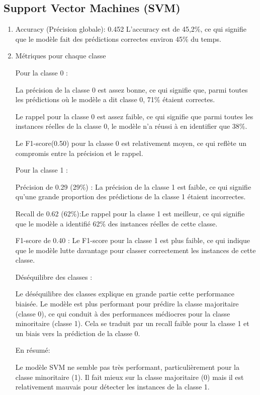 \subsection{Support Vector Machines (SVM)}
\begin{enumerate}
\item Accuracy (Précision globale): 0.452
L'accuracy est de 45,2\%, ce qui signifie que le modèle fait des prédictions correctes environ 45\% du temps.

\item Métriques pour chaque classe

Pour la classe 0 :

La précision de la classe 0 est assez bonne, ce qui signifie que, parmi toutes les prédictions où le modèle a dit classe 0, 71\% étaient correctes.

Le rappel pour la classe 0 est assez faible, ce qui signifie que parmi toutes les instances réelles de la classe 0, le modèle n'a réussi à en identifier que 38\%.

Le F1-score(0.50) pour la classe 0 est relativement moyen, ce qui reflète un compromis entre la précision et le rappel.

Pour la classe 1 :

Précision de  0.29 (29\%) : La précision de la classe 1 est faible, ce qui signifie qu'une grande proportion des prédictions de la classe 1 étaient incorrectes.


Recall de  0.62 (62\%):Le rappel pour la classe 1 est meilleur, ce qui signifie que le modèle a identifié 62\% des instances réelles de cette classe.

F1-score de 0.40 : Le F1-score pour la classe 1 est plus faible, ce qui indique que le modèle lutte davantage pour classer correctement les instances de cette classe.

Déséquilibre des classes :

Le déséquilibre des classes explique en grande partie cette performance biaisée. Le modèle est plus performant pour prédire la classe majoritaire (classe 0), ce qui conduit à des performances médiocres pour la classe minoritaire (classe 1). Cela se traduit par un recall faible pour la classe 1 et un biais vers la prédiction de la classe 0.

En résumé:

Le modèle SVM ne semble pas très performant, particulièrement pour la classe minoritaire (1). Il fait mieux sur la classe majoritaire (0) mais il est relativement mauvais pour détecter les instances de la classe 1.
\end{enumerate}

